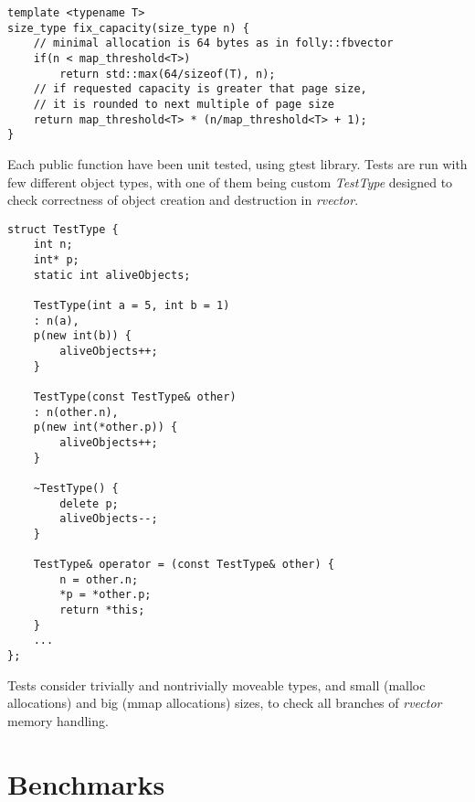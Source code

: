 \documentclass[inz, english, shortabstract]{iithesis}
\begin{document}
\begin{lstlisting}[caption=fix capacity]
template <typename T>
size_type fix_capacity(size_type n) {
	// minimal allocation is 64 bytes as in folly::fbvector
	if(n < map_threshold<T>)
        return std::max(64/sizeof(T), n);
    // if requested capacity is greater that page size,
    // it is rounded to next multiple of page size
    return map_threshold<T> * (n/map_threshold<T> + 1);
}
\end{lstlisting}
Each public function have been unit tested, using gtest library. Tests are run with few different object types, with one of them being custom {\it TestType} designed to check correctness of object creation and destruction in {\it rvector}.

\begin{lstlisting}[caption=TestType]
struct TestType {
	int n;
	int* p;
	static int aliveObjects;

	TestType(int a = 5, int b = 1)
	: n(a),
	p(new int(b)) {
		aliveObjects++;
	}

	TestType(const TestType& other)
	: n(other.n),
	p(new int(*other.p)) {
		aliveObjects++;
	}

	~TestType() {
		delete p;
		aliveObjects--;
	}

	TestType& operator = (const TestType& other) {
		n = other.n;
		*p = *other.p;
		return *this;
	}
	...
};
\end{lstlisting}
Tests consider trivially and nontrivially moveable types, and small (malloc allocations) and big (mmap allocations) sizes, to check all branches of {\it rvector} memory handling.

\chapter{Benchmarks}
\end{document}
